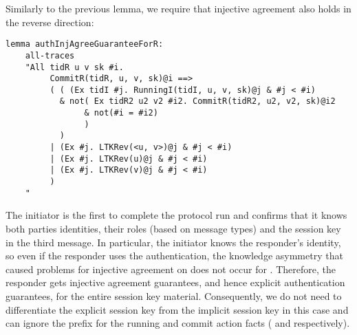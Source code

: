 Similarly to the previous lemma, we require that injective agreement also holds
in the reverse direction:
%

\begin{lstlisting}
lemma authInjAgreeGuaranteeForR:
    all-traces
    "All tidR u v sk #i.
         CommitR(tidR, u, v, sk)@i ==>
         ( ( (Ex tidI #j. RunningI(tidI, u, v, sk)@j & #j < #i)
           & not( Ex tidR2 u2 v2 #i2. CommitR(tidR2, u2, v2, sk)@i2
                & not(#i = #i2)
                )
           )
         | (Ex #j. LTKRev(<u, v>)@j & #j < #i)
         | (Ex #j. LTKRev(u)@j & #j < #i)
         | (Ex #j. LTKRev(v)@j & #j < #i)
         )
    "
\end{lstlisting}
%
The initiator is the first to complete the protocol run and confirms that
it knows both parties identities, their roles (based on message types) and the
session key in the third message.
%
In particular, the initiator knows the responder's identity, so even if the
responder uses the \mStat{} authentication, the knowledge asymmetry that caused
problems for injective agreement on \mGiy{} does not occur for \mGrx{}.
%
Therefore, the responder gets injective agreement guarantees, and hence explicit
authentication guarantees, for the entire session key material.
%
Consequently, we do not need to differentiate the explicit session key from the
implicit session key in this case and can ignore the  prefix for the
running and commit action facts ( and  respectively).
%
\\

